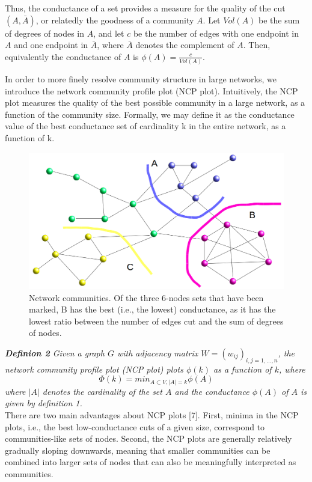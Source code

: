 \documentclass[12pt]{article}
\begin{document}
Thus, the conductance of a set provides a measure for the quality of the cut $(A,\bar{A})$, or relatedly the goodness of a community $A$. Let $Vol(A)$ be the sum of degrees of nodes in $A$, and let $c$ be the number of edges with one endpoint in $A$ and one endpoint in $\bar{A}$, where $\bar{A}$ denotes the complement of $A$. Then, equivalently the conductance of $A$ is $\phi(A)= \frac{c}{Vol(A)}$.

In order to more finely resolve community structure in large networks, we introduce the network community profile plot (NCP plot). Intuitively, the NCP plot measures the quality of the best possible community in a large network, as a function of the community size. Formally, we may define it as the conductance value of the best conductance set of cardinality k in the entire network, as a function of k.

\begin{figure}[h]
\begin{center}
\includegraphics[scale=0.2]{network_clustering.png}  
\caption{Network communities. Of the three 6-nodes sets that have been marked, B has the best (i.e., the lowest) conductance, as it has the lowest ratio between the number of edges cut and the sum of degrees of nodes.}
\end{center}
\end{figure}

\textit{\textbf{Definion 2} Given a graph $G$ with adjacency matrix $W =(w_{ij})_{i,j=1,...,n}$, the network community profile plot (NCP plot) plots $\phi(k)$ as a function of $k$, where
$$\Phi(k)=min_{A \subset V, |A|=k}\phi(A)$$
where $|A|$ denotes the cardinality of the set $A$ and the conductance $\phi(A)$ of $A$ is given by definition 1.}\\

There are two main advantages about NCP plots [7]. First, minima in the NCP plots, i.e., the
best low-conductance cuts of a given size, correspond to communities-like sets of nodes. Second, the NCP plots are generally relatively gradually sloping downwards, meaning that smaller communities can be combined into larger sets of nodes that can also be meaningfully interpreted as communities.\\
\end{document}
